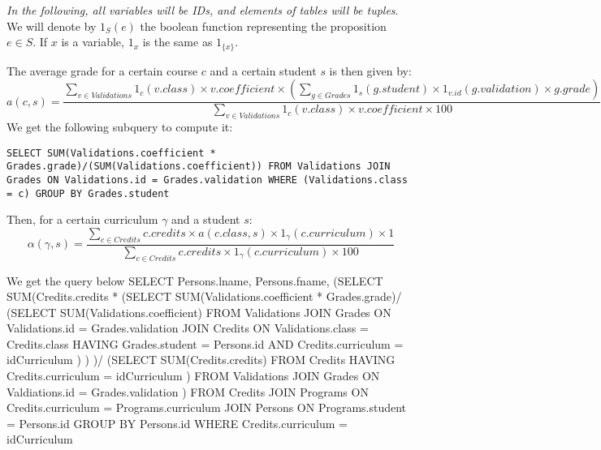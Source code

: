 \documentclass{cours}
\begin{document}
\textit{In the following, all variables will be IDs, and elements of tables will be tuples}. We will denote by $1_{S}(e)$ the boolean function representing the proposition $e \in S$. If $x$ is a variable, $1_{x}$ is the same as $1_{\{x\}}$.

The average grade for a certain course $c$ and a certain student $s$ is then given by:
\begin{equation*}
	a(c, s) = \frac{\sum_{v \in Validations} 1_{c}(v.class)\times v.coefficient \times \left(\sum_{g \in Grades} 1_{s}(g.student) \times 1_{v.id}(g.validation) \times g.grade\right)}{\sum_{v \in Validations}1_{c}(v.class)\times v.coefficient \times 100}
\end{equation*}
We get the following subquery to compute it: 
\begin{center}
	\tt SELECT SUM(Validations.coefficient * Grades.grade)/(SUM(Validations.coefficient)) FROM Validations JOIN Grades ON Validations.id = Grades.validation WHERE (Validations.class = c) GROUP BY Grades.student
\end{center}

Then, for a certain curriculum $\gamma$ and a student $s$: 
\begin{equation*}
	\alpha(\gamma, s) = \frac{\sum_{c \in Credits} c.credits \times a(c.class, s) \times 1_{\gamma}(c.curriculum) \times 1}{\sum_{c \in Credits}c.credits \times 1_{\gamma}(c.curriculum) \times 100}
\end{equation*}

We get the query below
SELECT 
	Persons.lname, 
	Persons.fname, 
	(SELECT SUM(Credits.credits *
			(SELECT SUM(Validations.coefficient * Grades.grade)/
				(SELECT SUM(Validations.coefficient)
					FROM Validations 
					JOIN Grades ON Validations.id = Grades.validation
					JOIN Credits ON Validations.class = Credits.class
					HAVING Grades.student = Persons.id 
						AND Credits.curriculum = idCurriculum
				)
			)
		)/
		(SELECT SUM(Credits.credits) 
			FROM Credits 
			HAVING Credits.curriculum = idCurriculum
		) 
		FROM Validations 
		JOIN Grades ON Valdiations.id = Grades.validation
	)
	FROM Credits 
	JOIN Programs ON Credits.curriculum = Programs.curriculum
	JOIN Persons ON Programs.student = Persons.id
	GROUP BY Persons.id
	WHERE Credits.curriculum = idCurriculum
\end{document}
